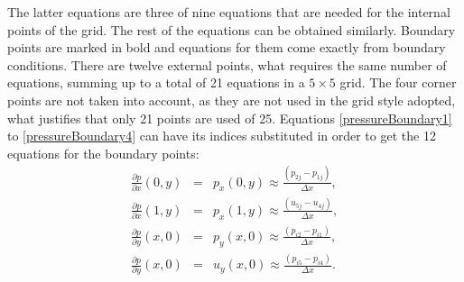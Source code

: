 \documentclass[journal]{IEEEtran}
\begin{document}
The latter equations are three of nine equations that are needed for the internal points of the grid. The rest of the equations can be obtained similarly. Boundary points are marked in bold and equations for them come exactly from boundary conditions. There are twelve external points, what requires the same number of equations, summing up to a total of 21 equations in a $5\times 5$ grid. The four corner points are not taken into account, as they are not used in the grid style adopted, what justifies that only 21 points are used of 25. Equations \ref{pressureBoundary1} to \ref{pressureBoundary4} can have its indices substituted in order to get the 12 equations for the boundary points: \begin{eqnarray}
\frac{\partial p}{\partial x}\left(0, y\right) &=& p_x\left(0, y\right)  \approx  \frac{(p_{2j} - p_{1j})}{\Delta x} \label{pressureBoundary1},\\
\frac{\partial p}{\partial x}\left(1, y\right) &=& p_x\left(1, y\right)  \approx  \frac{(u_{5j} - u_{4j})}{\Delta x},\\
\frac{\partial p}{\partial y}\left(x, 0\right) &=& p_y\left(x, 0\right)  \approx \frac{(p_{i2} - p_{i1})}{\Delta x},\\
\frac{\partial p}{\partial y}\left(x, 0\right) &=& u_y\left(x, 0\right)  \approx  \frac{(p_{i5} - p_{i4})}{\Delta x}.\label{pressureBoundary4}
\end{eqnarray}
\end{document}
